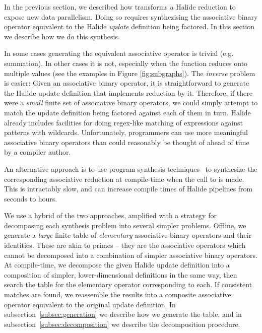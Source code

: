 In the previous section, we described how  transforms a Halide reduction to expose new data parallelism. Doing so requires synthezising the associative binary operator equivalent to the Halide \emph{update} definition being factored. In this section we describe how we do this synthesis.

In some cases generating the equivalent associative operator is trivial (e.g. summation). In other cases it is not, especially when the function reduces onto multiple values (see the examples in Figure \ref{fig:subgraphs}). The \emph{inverse} problem is easier: Given an associative binary operator, it is straightforward to generate the Halide update definition that implements reduction by it. Therefore, if there were a \emph{small} finite set of associative binary operators, we could simply attempt to match the update definition being factored against each of them in turn. Halide already includes facilities for doing regex-like matching of expressions against patterns with wildcards. Unfortunately, programmers can use more meaningful associative binary operators than could reasonably be thought of ahead of time by a compiler author.

An alternative approach is to use program synthesis techniques~\cite{Solar-Lezama:2008:PSS:1714168, Torlak:2013:GSL:2509578.2509586} to synthesize the corresponding associative reduction at compile-time when the call to  is made. This is intractably slow, and can increase compile times of Halide pipelines from seconds to hours.

We use a hybrid of the two approaches, amplified with a strategy for decomposing each synthesis problem into several simpler problems. Offline, we generate a \emph{large} finite table of \emph{elementary} associative binary operators and their identities. These are akin to primes -- they are the associative operators which cannot be decomposed into a combination of simpler associative binary operators. At compile-time, we decompose the given Halide update definition into a composition of simpler, lower-dimensional definitions in the same way, then search the table for the elementary operator corresponding to each. If consistent matches are found, we reassemble the results into a composite associative operator equivalent to the original update definition. In subsection~\ref{subsec:generation} we describe how we generate the table, and in subsection~\ref{subsec:decomposition} we describe the decomposition procedure.

